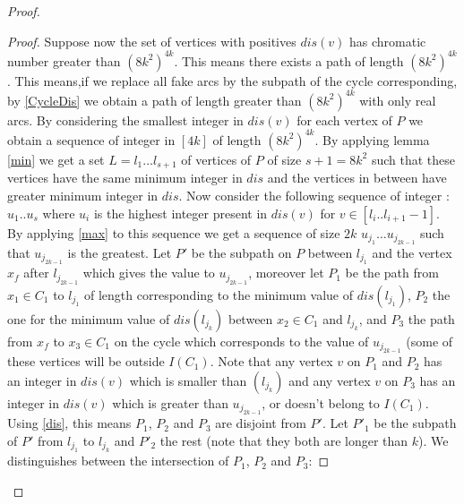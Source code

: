 \documentclass[utf8,10pt]{article}
\theoremstyle{plain}
\theoremstyle{definition}
\theoremstyle{remark}
\begin{document}
\begin{proof}
\begin{proof}





Suppose now the set of vertices with positives $dis(v)$ has chromatic number greater than $(8k^2)^{4k}$.
This means there exists a path of length $(8k^2)^{4k}$. This means,if we replace all fake arcs by the subpath of
the cycle corresponding, by \ref{CycleDis} we obtain a path of length greater than $(8k^2)^{4k}$ with only real arcs.
By considering the smallest integer in $dis(v)$ for each vertex of $P$ we obtain a sequence of integer in $[4k]$ of length $(8k^2)^{4k}$.
By applying lemma \ref{min} we get a set $L = l_1 \dots l_{s+1}$ of vertices of $P$ of size $s+1 = 8k^2$ such that these
vertices have the same minimum integer in $dis$ and the vertices in between have greater minimum integer in $dis$.
Now consider the following sequence of integer : $u_1 .. u_s$ where $u_i$ is the highest integer present in $dis(v)$
for $v \in [l_i .. l_{i+1} - 1]$.
By applying \ref{max} to this sequence we get a sequence of size $2k$ $u_{j_1} \dots u_{j_{2k-1}}$ such that $u_{j_{2k-1}}$ is the greatest.
Let $P'$ be the subpath on $P$ between $l_{j_1}$ and the vertex $x_f$ after $l_{j_{2k-1}}$ which gives the value to $u_{j_{2k-1}}$,
moreover let $P_1$  be the path from $x_1 \in C_1$ to $l_{j_1}$ of length corresponding to the minimum value of $dis(l_{j_1})$,
$P_2$ the one for the minimum value of $dis(l_{j_k})$ between $x_2 \in C_1$ and $l_{j_k}$, and $P_3$ the path
from $x_f$ to $x_3 \in C_1$ on the cycle which corresponds to the value of $u_{j_{2k-1}}$
(some of these vertices will be outside $I(C_1)$. Note that any vertex $v$ on $P_1$ and $P_2$ has an integer in $dis(v)$
which is smaller than $(l_{j_k})$ and any vertex $v$ on $P_3$ has an integer in $dis(v)$ which
is greater than $u_{j_{2k-1}}$, or doesn't belong to $I(C_1)$. Using \ref{dis}, this means
$P_1$, $P_2$ and $P_3$ are disjoint from $P'$. Let $P'_1$ be the subpath of $P'$ from $l_{j_1}$ to $l_{j_k}$ and  $P'_2$ the rest
(note that they both are longer than $k$).
We distinguishes between the intersection of $P_1$, $P_2$ and $P_3$:


\end{proof}
\end{proof}
\end{document}
